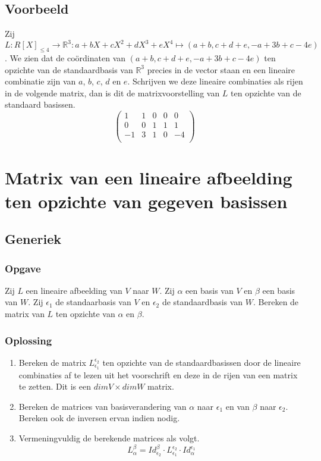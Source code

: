 \documentclass[lineaire_algebra_oplossingen.tex]{subfiles}
\begin{document}
\subsection*{Voorbeeld}
Zij $L:R[X]_{\le 4}\rightarrow \mathbb{R}^3: a+bX+cX^2+dX^3+eX^4\mapsto (a+b,c+d+e,-a+3b+c-4e)$.
We zien dat de co\"ordinaten van $(a+b,c+d+e,-a+3b+c-4e)$ ten opzichte van de standaardbasis van $\mathbb{R}^3$ precies in de vector staan en een lineaire combinatie zijn van $a$, $b$, $c$, $d$ en $e$.
Schrijven we deze lineaire combinaties als rijen in de volgende matrix, dan is dit de matrixvoorstelling van $L$ ten opzichte van de standaard basissen.
\[
\begin{pmatrix}
1 & 1 & 0 & 0 & 0\\
0 & 0 & 1 & 1 & 1\\
-1 & 3 & 1 & 0 & -4\\
\end{pmatrix}
\]


\section{Matrix van een lineaire afbeelding ten opzichte van gegeven basissen}
\label{matrix_van_lineaire_afbeeldingen_tov_gegeven_basissen}

\subsection*{Generiek}
\subsubsection*{Opgave}
Zij $L$ een lineaire afbeelding van $V$ naar $W$.
Zij $\alpha$ een basis van $V$ en $\beta$ een basis van $W$.
Zij $\epsilon_1$ de standaarbasis van $V$ en $\epsilon_2$ de standaardbasis van $W$.
Bereken de matrix van $L$ ten opzichte van $\alpha$ en $\beta$.
\subsubsection*{Oplossing}
\begin{enumerate}
\item
Bereken de matrix $L_{\epsilon_1}^{\epsilon_2}$ ten opzichte van de standaardbasissen door de lineaire combinaties af te lezen uit het voorschrift en deze in de rijen van een matrix te zetten.
Dit is een $dimV \times dimW$ matrix.

\item
Bereken de matrices van basisverandering van $\alpha$ naar $\epsilon_1$ en van $\beta$ naar $\epsilon_2$. Bereken ook de inversen ervan indien nodig.

\item
Vermeningvuldig de berekende matrices als volgt.
\[
L_{\alpha}^{\beta}
= Id_{\epsilon_2}^{\beta} \cdot L_{\epsilon_1}^{\epsilon_2} \cdot Id_{\alpha}^{\epsilon_1} 
\]
\end{enumerate}
\end{document}
